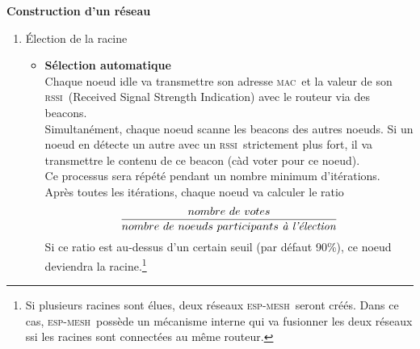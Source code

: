 \documentclass[a4paper, 12pt]{report}
\newcommand{\espmesh}{\textsc{esp-mesh}}
\newcommand{\mac}{\textsc{mac}}
\newcommand{\rssi}{\textsc{rssi}}
\begin{document}
        \textbf{Construction d'un réseau}
        \newline
        \begin{enumerate}
            \item \'Election de la racine
                \begin{itemize}
                    \item \textbf{Sélection automatique}\\
                        Chaque noeud idle va transmettre son adresse \mac\ et
                        la valeur de son \rssi\ (Received Signal Strength Indication) avec le routeur via des beacons.\\
                        Simultanément, chaque noeud scanne les beacons des autres noeuds. Si un noeud
                        en détecte un autre avec un \rssi\ strictement plus fort, il va transmettre le contenu de
                        ce beacon (càd voter pour ce noeud).\\
                        Ce processus sera répété pendant un nombre minimum d'itérations.\\
                        Après toutes les itérations, chaque noeud va calculer le ratio
                        \[\frac{nombre\ de\ votes}{nombre\ de\ noeuds\ participants\ \textrm{\textit{à l'élection}}}\]
                        Si ce ratio est au-dessus d'un certain seuil (par défaut 90\%), ce noeud deviendra la racine.\footnote{
                            Si plusieurs racines sont élues, deux réseaux \espmesh\ seront créés.
                            Dans ce cas, \espmesh\ possède un mécanisme interne qui va fusionner les deux réseaux
                            ssi les racines sont connectées au même routeur.
                        }




\end{itemize}
\end{enumerate}
\end{document}
